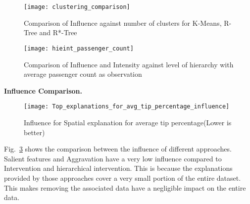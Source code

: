 \begin{figure}[H]
\texttt{[image: clustering\_comparison]}
\caption{Comparison of Influence against number of clusters for K-Means, R-Tree and R*-Tree}
\label{fig:clustering_comparison}
\end{figure}

\begin{figure}[h]
\texttt{[image: hieint\_passenger\_count]}
\caption{Comparison of Influence and Intensity against level of hierarchy with average passenger count as observation}
\label{fig:hieint_passenger_count}
\end{figure}
\textbf{Influence Comparison.}
\begin{figure}[h]
\texttt{[image: Top\_explanations\_for\_avg\_tip\_percentage\_influence]}
\caption{Influence for Spatial explanation for average tip percentage(Lower is better)}
\label{fig:influence_comparison}
\end{figure}

Fig.~\ref{fig:influence_comparison} shows the comparison between the influence of different approaches. Salient features and Aggravation have a very low influence compared to Intervention and hierarchical intervention. This is because the explanations provided by those approaches cover a very small portion of the entire dataset. This makes removing the associated data have a negligible impact on the entire data.

